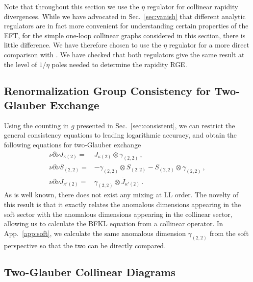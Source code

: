 \documentclass[letterpaper,11pt]{article}
\renewcommand{\sec}[1]{Sec.~\ref{sec:#1}}
\newcommand{\app}[1]{App.~\ref{app:#1}}
\newcommand{\gs}{g}
\DeclareRobustCommand{\Sec}[1]{Sec.~\ref{#1}}
\begin{document}
Note that throughout this section we use the $\eta$ regulator for collinear rapidity divergences. While we have advocated in \Sec{sec:vanish} that different analytic regulators are in fact more convenient for understanding certain properties of the EFT, for the simple one-loop collinear graphs considered in this section, there is little difference. We have therefore chosen to use the $\eta$ regulator for a more direct comparison with \cite{Rothstein:2016bsq}. We have checked that both regulators give the same result at the level of $1/\eta$ poles needed to determine the rapidity RGE. 

\subsection{Renormalization Group Consistency for Two-Glauber Exchange}
\label{sec:BFKL_consistency}

Using the counting in $\gs$ presented in \sec{consistent}, we can restrict the general consistency equations to leading logarithmic accuracy, and obtain the following equations for two-Glauber exchange
\begin{align}\label{eq:consistency_LL}
  \nu\partial\nu J_{\kappa(2)}=&  J_{\kappa(2)} \otimes \gamma_{(2,2)}\,,\\
  \nu\partial\nu S_{(2,2)}=& -\gamma_{(2,2)}\otimes S_{(2,2)} - S_{(2,2)}\otimes \gamma_{(2,2)}\,,\\
  \nu\partial\nu \bar J_{\kappa'(2)}=&  \gamma_{(2,2)} \otimes \bar J_{\kappa'(2)} \,.
\end{align}
As is well known, there does not exist any mixing at LL order. The novelty of this result is that it exactly relates the anomalous dimensions appearing in the soft sector with the anomalous dimensions appearing in the collinear sector, allowing us to calculate the BFKL equation from a collinear operator. 
 In \app{soft}, we calculate the same anomalous dimension $\gamma_{(2,2)}$ from the soft perspective so that the two can be directly compared.

\subsection{Two-Glauber Collinear Diagrams}
\label{sec:BFKL_graphs}
\end{document}
